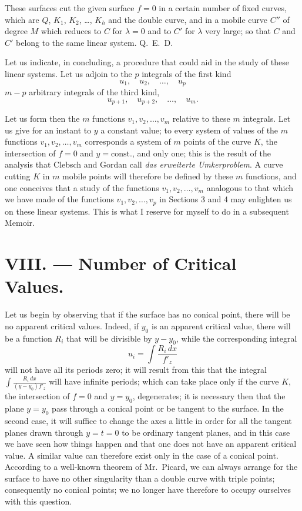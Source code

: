 \documentclass{article}
\begin{document}
These surfaces cut the given surface $f = 0$ in a certain number of fixed curves, which are $Q$, $K_{1}$, $K_{2}$, \ldots, $K_{h}$ and the double curve, and in a mobile curve $C''$ of degree $M$ which reduces to $C$ for $\lambda = 0$ and to $C'$ for $\lambda$ very large; so that $C$ and $C'$ belong to the same linear system. Q.~E.~D.

Let us indicate, in concluding, a procedure that could aid in the study of these linear systems. Let us adjoin to the $p$ integrals of the first kind
\[
u_{1}, \quad u_{2}, \quad \ldots, \quad u_{p}
\]
$m - p$ arbitrary integrals of the third kind,
\[
u_{p+1}, \quad u_{p+2}, \quad \ldots, \quad u_{m}.
\]

Let us form then the $m$ functions $v_{1}, v_{2}, \ldots, v_{m}$ relative to these $m$ integrals. Let us give for an instant to $y$ a constant value; to every system of values of the $m$ functions $v_{1}, v_{2}, \ldots, v_{m}$ corresponds a system of $m$ points of the curve $K$, the intersection of $f = 0$ and $y = \text{const.}$, and only one; this is the result of the analysis that Clebsch and Gordan call \emph{das erweiterte Umkerproblem}. A curve cutting $K$ in $m$ mobile points will therefore be defined by these $m$ functions, and one conceives that a study of the functions $v_{1}, v_{2}, \ldots, v_{m}$ analogous to that which we have made of the functions $v_{1}, v_{2}, \ldots, v_{p}$ in Sections 3 and 4
may enlighten us on these linear systems. This is what I reserve for myself to do in a subsequent Memoir.

\section*{VIII. --- Number of Critical Values.}

Let us begin by observing that if the surface has no conical point, there will be no apparent critical values. Indeed, if $y_{0}$ is an apparent critical value, there will be a function $R_{i}$ that will be divisible by $y - y_{0}$, while the corresponding integral
\[
u_{i} = \int \frac{R_{i}\,dx}{f'_{z}}
\]
will not have all its periods zero; it will result from this that the integral $\displaystyle\int \frac{R_{i}\,dx}{(y - y_{0})f'_{z}}$ will have infinite periods; which can take place only if the curve $K$, the intersection of $f = 0$ and $y = y_{0}$, degenerates; it is necessary then that the plane $y = y_{0}$ pass through a conical point or be tangent to the surface. In the second case, it will suffice to change the axes a little in order for all the tangent planes drawn through $y = t = 0$ to be ordinary tangent planes, and in this case we have seen how things happen and that one does not have an apparent critical value. A similar value can therefore exist only in the case of a conical point. According to a well-known theorem of Mr.~Picard, we can always arrange for the surface to have no other singularity than a double curve with triple points; consequently no conical points; we no longer have therefore to occupy ourselves with this question.
\end{document}
